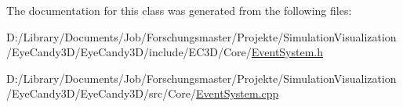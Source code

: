 The documentation for this class was generated from the following files\+:\begin{DoxyCompactItemize}
\item 
D\+:/\+Library/\+Documents/\+Job/\+Forschungsmaster/\+Projekte/\+Simulation\+Visualization/\+Eye\+Candy3\+D/\+Eye\+Candy3\+D/include/\+E\+C3\+D/\+Core/\mbox{\hyperlink{_event_system_8h}{Event\+System.\+h}}\item 
D\+:/\+Library/\+Documents/\+Job/\+Forschungsmaster/\+Projekte/\+Simulation\+Visualization/\+Eye\+Candy3\+D/\+Eye\+Candy3\+D/src/\+Core/\mbox{\hyperlink{_event_system_8cpp}{Event\+System.\+cpp}}\end{DoxyCompactItemize}
